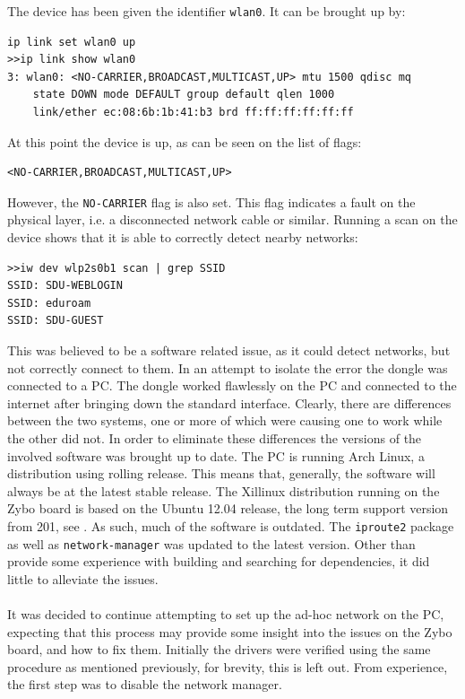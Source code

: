 The device has been given the identifier \texttt{wlan0}.
It can be brought up by:
\begin{lstlisting}
ip link set wlan0 up
>>ip link show wlan0
3: wlan0: <NO-CARRIER,BROADCAST,MULTICAST,UP> mtu 1500 qdisc mq 
	state DOWN mode DEFAULT group default qlen 1000
    link/ether ec:08:6b:1b:41:b3 brd ff:ff:ff:ff:ff:ff
\end{lstlisting}
At this point the device is up, as can be seen on the list of flags:
\begin{lstlisting}
<NO-CARRIER,BROADCAST,MULTICAST,UP>
\end{lstlisting}
However, the \texttt{NO-CARRIER} flag is also set.
This flag indicates a fault on the physical layer, i.e. a disconnected network cable or similar.
Running a scan on the device shows that it is able to correctly detect nearby networks:
\begin{lstlisting}
>>iw dev wlp2s0b1 scan | grep SSID
SSID: SDU-WEBLOGIN
SSID: eduroam
SSID: SDU-GUEST
\end{lstlisting}
This was believed to be a software related issue, as it could detect networks, but not correctly connect to them.
In an attempt to isolate the error the dongle was connected to a PC.
The dongle worked flawlessly on the PC and connected to the internet after bringing down the standard interface.
Clearly, there are differences between the two systems, one or more of which were causing one to work while the other did not.
In order to eliminate these differences the versions of the involved software was brought up to date.
The PC is running Arch Linux, a distribution using rolling release.
This means that, generally, the software will always be at the latest stable release.
The Xillinux distribution running on the Zybo board is based on the Ubuntu 12.04 release, the long term support version from 201, see \cite{xillinux}. 
As such, much of the software is outdated.
The \texttt{iproute2} package as well as \texttt{network-manager} was updated to the latest version.
Other than provide some experience with building and searching for dependencies, it did little to alleviate the issues.
\\~\\
It was decided to continue attempting to set up the ad-hoc network on the PC, expecting that this process may provide some insight into the issues on the Zybo board, and how to fix them.
Initially the drivers were verified using the same procedure as mentioned previously, for brevity, this is left out.
From experience, the first step was to disable the network manager.
